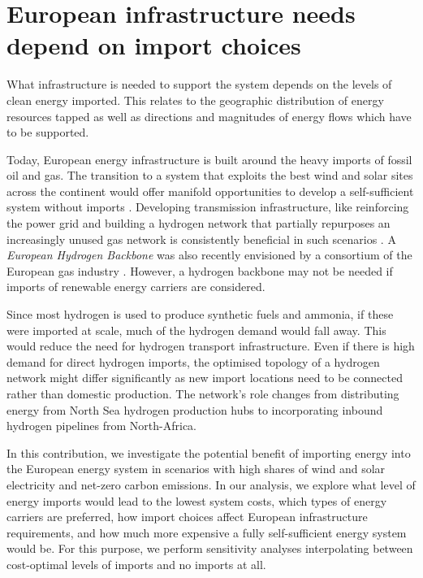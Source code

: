 \documentclass[12pt,3p]{elsarticle}
\begin{document}
\section*{European infrastructure needs depend on import choices}

What infrastructure is needed to support the system depends on the levels of
clean energy imported. This relates to the geographic distribution of energy
resources tapped as well as directions and magnitudes of energy flows which have
to be supported.

Today, European energy infrastructure is built around the heavy imports of
fossil oil and gas. The transition to a system that exploits the best wind and
solar sites across the continent would offer manifold opportunities to develop a
self-sufficient system without imports
\cite{pickeringDiversityOptions2022,brownSynergiesSector2018}. Developing
transmission infrastructure, like reinforcing the power grid and building a
hydrogen network that partially repurposes an increasingly unused gas network is
consistently beneficial in such scenarios \cite{neumannBenefitsHydrogen2022,wetzelGreenEnergy2022}. A
\textit{European Hydrogen Backbone} was also recently envisioned by a consortium
of the European gas industry
\cite{gasforclimateEuropeanHydrogen2020,gasforclimateEuropeanHydrogen2022}.
However, a hydrogen backbone may not be needed if imports of renewable energy
carriers are considered.

Since most hydrogen is used to produce synthetic fuels and ammonia, if these
were imported at scale, much of the hydrogen demand would fall away. This would
reduce the need for hydrogen transport infrastructure. Even if there is high
demand for direct hydrogen imports, the optimised topology of a hydrogen network
might differ significantly as new import locations need to be connected rather
than domestic production.  The network's role changes from distributing energy
from North Sea hydrogen production hubs to incorporating inbound hydrogen
pipelines from North-Africa.

In this contribution, we investigate the potential benefit of importing energy
into the European energy system in scenarios with high shares of wind and solar
electricity and net-zero carbon emissions. In our analysis, we explore what
level of energy imports would lead to the lowest system costs, which types of
energy carriers are preferred, how import choices affect European infrastructure
requirements, and how much more expensive a fully self-sufficient energy system
would be. For this purpose, we perform sensitivity analyses interpolating
between cost-optimal levels of imports and no imports at all.
\end{document}
